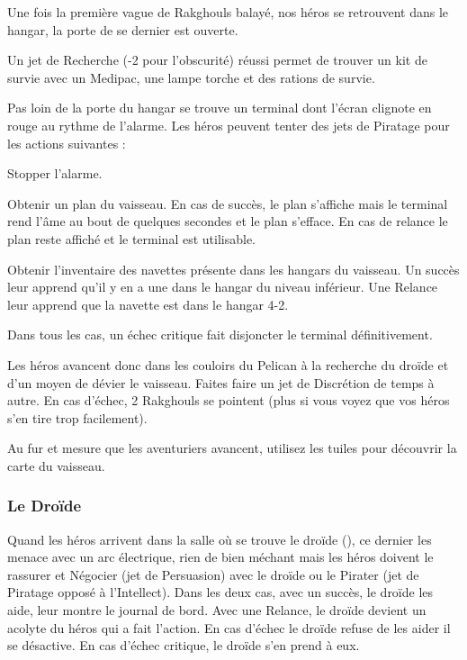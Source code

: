 Une fois la première vague de Rakghouls balayé, nos héros se retrouvent dans le hangar, la porte de se dernier est ouverte.

Un jet de Recherche (-2 pour l’obscurité) réussi permet de trouver un kit de survie avec un Medipac, une lampe torche et des rations de survie.

Pas loin de la porte du hangar se trouve un terminal dont l’écran clignote en rouge au rythme de l’alarme. Les héros peuvent tenter des jets de Piratage pour les actions suivantes :
\begin{rebelist}
	\item Stopper l’alarme. 
	\item Obtenir un plan du vaisseau. En cas de succès, le plan s’affiche mais le terminal rend l’âme au bout de quelques secondes et le plan s’efface. En cas de relance le plan reste affiché et le terminal est utilisable.
	\item Obtenir l’inventaire des navettes présente dans les hangars du vaisseau. Un succès leur apprend qu’il y en a une dans le hangar du niveau inférieur. Une Relance leur apprend que la navette est dans le hangar 4-2.
\end{rebelist}
Dans tous les cas, un échec critique fait disjoncter le terminal définitivement.

Les héros avancent donc dans les couloirs du Pelican à la recherche du droïde et d’un moyen de dévier le vaisseau. Faites faire un jet de Discrétion de temps à autre. En cas d’échec, 2 Rakghouls se pointent (plus si vous voyez que vos héros s’en tire trop facilement).

Au fur et mesure que les aventuriers avancent, utilisez les tuiles pour découvrir la carte du vaisseau.

\subsubsection{Le Droïde}
Quand les héros arrivent dans la salle où se trouve le droïde (), ce dernier les menace avec un arc électrique, rien de bien méchant mais les héros doivent le rassurer et Négocier (jet de Persuasion) avec le droïde ou le Pirater (jet de Piratage opposé à l’Intellect). Dans les deux cas, avec un succès, le droïde les aide, leur montre le journal de bord. Avec une Relance, le droïde devient un acolyte du héros qui a fait l’action. En cas d’échec le droïde refuse de les aider il se désactive. En cas d’échec critique, le droïde s’en prend à eux.


